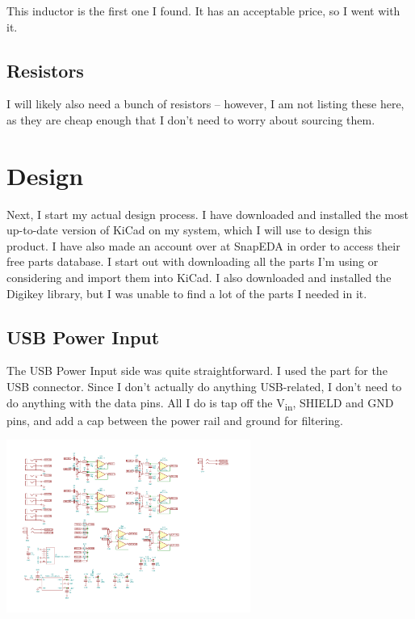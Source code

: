 \documentclass[a4paper]{article}
\begin{document}
This inductor is the first one I found. It has an acceptable price, so I went with it.

\subsection{Resistors}

I will likely also need a bunch of resistors -- however, I am not listing these here, as they are cheap enough that I don't need to worry about sourcing them.

\section{Design}

Next, I start my actual design process. I have downloaded and installed the most up-to-date version of KiCad on my system, which I will use to design this product. I have also made an account over at SnapEDA in order to access their free parts database. I start out with downloading all the parts I'm using or considering and import them into KiCad. I also downloaded and installed the Digikey library, but I was unable to find a lot of the parts I needed in it.

\subsection{USB Power Input}

The USB Power Input side was quite straightforward. I used the part for the USB connector. Since I don't actually do anything USB-related, I don't need to do anything with the data pins. All I do is tap off the V\textsubscript{in}, SHIELD and GND pins, and add a cap between the power rail and ground for filtering.

\begin{center}
  \includegraphics[trim={2cm 5.5cm 21cm 12.8cm},width=8cm,clip]{images/audio-mixer.pdf}
\end{center}
\end{document}

